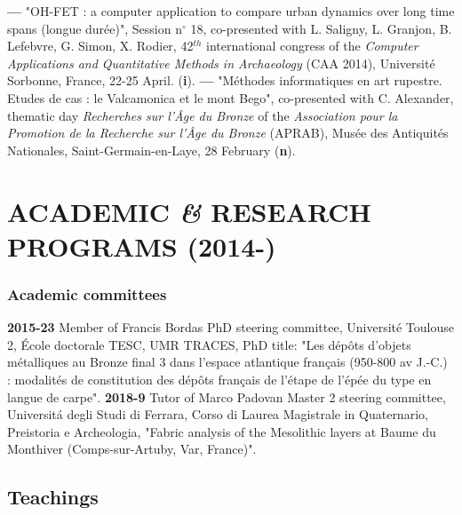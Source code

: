 \documentclass{article}
\begin{document}
\smallbreak
\textbf{--- }"OH-FET : a computer application to compare urban dynamics over long time spans (longue dur\'{e}e)", Session n$\mathrm{{}^\circ}$ 18, co-presented with L. Saligny, L. Granjon, B. Lefebvre, G. Simon, X. Rodier, 42${}^{th}$ international congress of the \textit{Computer Applications and Quantitative Methods in Archaeology} (CAA 2014), Universit\'{e} Sorbonne, France, 22-25 April. (\textbf{i}).
\smallbreak
\textbf{--- }"M\'{e}thodes informatiques en art rupestre. Etudes de cas : le Valcamonica et le mont Bego", co-presented with C. Alexander, thematic day \textit{Recherches sur l'\^{A}ge du Bronze }of the\textit{ Association pour la Promotion de la Recherche sur l'\^{A}ge du Bronze }(APRAB), Mus\'{e}e des Antiquit\'{e}s Nationales, Saint-Germain-en-Laye, 28 February (\textbf{n}).

\section{ACADEMIC \textit{\&} RESEARCH PROGRAMS (2014-)}

\subsubsection*{Academic committees}

\textbf{2015-23 }Member of Francis Bordas PhD steering committee, Universit\'{e} Toulouse 2, \'{E}cole doctorale TESC, UMR TRACES, PhD title: "Les d\'{e}p\^{o}ts d'objets m\'{e}talliques au Bronze final 3 dans l'espace atlantique fran\c{c}ais (950-800 av J.-C.) : modalit\'{e}s de constitution des d\'{e}p\^{o}ts fran\c{c}ais de l'\'{e}tape de l'\'{e}p\'{e}e du type en langue de carpe".
\smallbreak
\textbf{2018-9 }Tutor of Marco Padovan Master 2 steering committee, Universit\'{a} degli Studi di Ferrara, Corso di Laurea Magistrale in Quaternario, Preistoria e Archeologia, "Fabric analysis of the Mesolithic layers at Baume du Monthiver (Comps-sur-Artuby, Var, France)".

\subsection*{Teachings}
\end{document}
